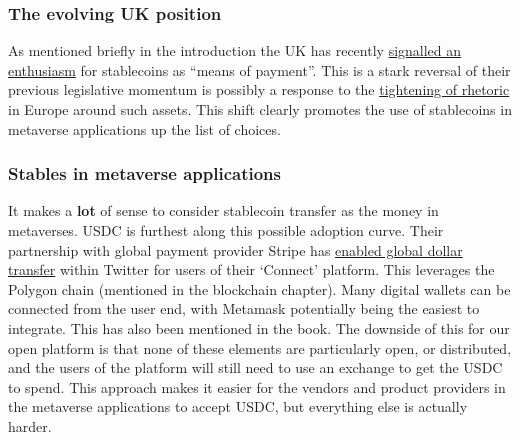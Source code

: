   




\subsubsection{The evolving UK position}
As mentioned briefly in the introduction the UK has recently \href{https://www.gov.uk/government/news/government-sets-out-plan-to-make-uk-a-global-cryptoasset-technology-hub}{signalled an enthusiasm} for stablecoins as ``means of payment''. This is a stark reversal of their previous legislative momentum is possibly a response to the \href{https://www.coindesk.com/policy/2022/05/11/eu-commission-favors-ban-on-large-scale-stablecoins-document-shows/}{tightening of rhetoric} in Europe around such assets. This shift clearly promotes the use of stablecoins in metaverse applications up the list of choices. 
\subsubsection{Stables in metaverse applications}
It makes a \textbf{lot} of sense to consider stablecoin transfer as the money in metaverses. USDC is furthest along this possible adoption curve. Their partnership with global payment provider Stripe has \href{https://stripe.com/blog/expanding-global-payouts-with-crypto}{enabled global dollar transfer} within Twitter for users of their `Connect' platform. This leverages the Polygon chain (mentioned in the blockchain chapter). Many digital wallets can be connected from the user end, with Metamask potentially being the easiest to integrate. This has also been mentioned in the book. The downside of this for our open platform is that none of these elements are particularly open, or distributed, and the users of the platform will still need to use an exchange to get the USDC to spend. This approach makes it easier for the vendors and product providers in the metaverse applications to accept USDC, but everything else is actually harder.


